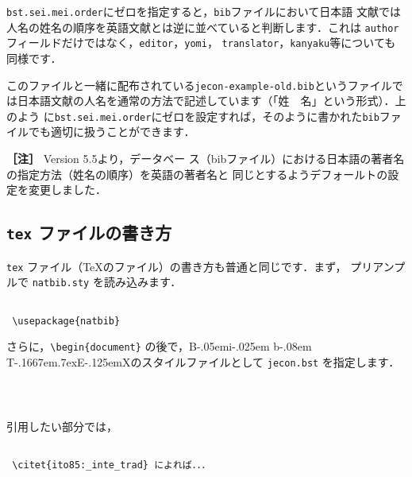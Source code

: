 \documentclass[a4j,10pt]{jarticle}
\def\BibTeX{{\rm B\kern-.05em{\sc i\kern-.025em b}\kern-.08em
    T\kern-.1667em\lower.7ex\hbox{E}\kern-.125emX}}
\begin{document}
\texttt{bst.sei.mei.order}にゼロを指定すると，\texttt{bib}ファイルにおいて日本語
文献では人名の姓名の順序を英語文献とは逆に並べていると判断します．これは
\texttt{author}フィールドだけではなく，\texttt{editor}，\texttt{yomi}，
\texttt{translator}，\texttt{kanyaku}等についても同様です．
\vspace*{1em}

このファイルと一緒に配布されている\texttt{jecon-example-old.bib}というファイルで
は日本語文献の人名を通常の方法で記述しています（「姓　名」という形式）．上のよう
に\texttt{bst.sei.mei.order}にゼロを設定すれば，そのように書かれた\texttt{bib}ファ
イルでも適切に扱うことができます．

\vspace*{1em}

\noindent \textcolor[named]{BrickRed}{\textbf{［注］}} Version 5.5より，データベー
ス（bibファイル）における日本語の著者名の指定方法（姓名の順序）を英語の著者名と
同じとするようデフォールトの設定を変更しました．


\subsection{\texttt{tex} ファイルの書き方}

\texttt{tex} ファイル（\TeX のファイル）の書き方も普通と同じです．まず，
プリアンプルで \texttt{natbib.sty} を読み込みます．

\begin{screen}
 \begin{verbatim}

 \usepackage{natbib}
 \end{verbatim}
\end{screen}

さらに，\verb|\begin{document}| の後で，\BibTeX のスタイルファイルとして 
\texttt{jecon.bst} を指定します．

\begin{screen}
 \begin{verbatim}

 
 \end{verbatim}
\end{screen}

引用したい部分では，

\begin{screen}
 \begin{verbatim}
        
 \citet{ito85:_inte_trad} によれば．．．
 \end{verbatim}
\end{screen}
\end{document}
